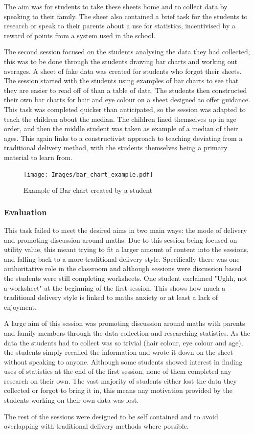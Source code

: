 \documentclass[11pt, a4paper, notitlepage]{article}
\begin{document}
The aim was for students to take these sheets home and to collect data by speaking to their family. The sheet also contained a brief task for the students to research or speak to their parents about a use for statistics, incentivised by a reward of points from a system used in the school.
\par
\vspace{1em}
The second session focused on the students analysing the data they had collected, this was to be done through the students drawing bar charts and working out averages. A sheet of fake data was created for students who forgot their sheets. The session started with the students using examples of bar charts to see that they are easier to read off of than a table of data. The students then constructed their own bar charts for hair and eye colour on a sheet designed to offer guidance. This task was completed quicker than anticipated, so the session was adapted to teach the children about the median. The children lined themselves up in age order, and then the middle student was taken as example of a median of their ages. This again links to a constructivist approach to teaching deviating from a traditional delivery method, with the students themselves being a primary material to learn from.

\begin{figure}[h]
    \centering
    \texttt{[image: Images/bar\_chart\_example.pdf]}
    \caption{Example of Bar chart created by a student}
\end{figure}

\subsubsection*{Evaluation}
This task failed to meet the desired aims in two main ways: the mode of delivery and promoting discussion around maths. Due to this session being focused on utility value, this meant trying to fit a larger amount of content into the sessions, and falling back to a more traditional delivery style. Specifically there was one authoritative role in the classroom and although sessions were discussion based the students were still completing worksheets. One student exclaimed "Ughh, not a worksheet" at the beginning of the first session. This shows how much a traditional delivery style is linked to maths anxiety or at least a lack of enjoyment.
\par
A large aim of this session was promoting discussion around maths with parents and family members through the data collection and researching statistics. As the data the students had to collect was so trivial (hair colour, eye colour and age), the students simply recalled the information and wrote it down on the sheet without speaking to anyone. Although some students showed interest in finding uses of statistics at the end of the first session, none of them completed any research on their own. The vast majority of students either lost the data they collected or forgot to bring it in, this means any motivation provided by the students working on their own data was lost.
\par
The rest of the sessions were designed to be self contained and to avoid overlapping with traditional delivery methods where possible.
\end{document}
